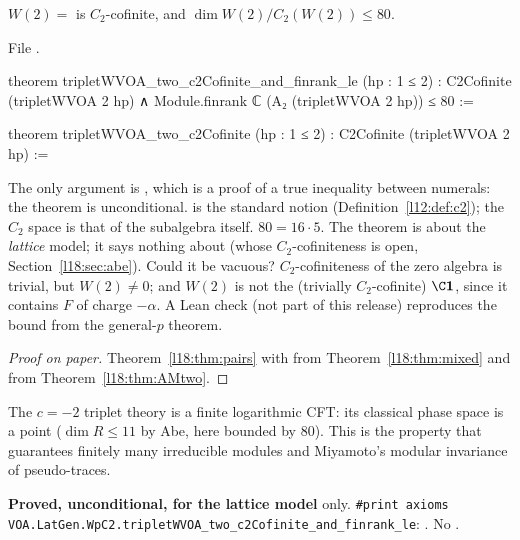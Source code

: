 \begin{theorem}\label{l18:thm:c2two}
$W(2)=$  is $C_2$-cofinite, and $\dim W(2)/C_2(W(2))\le80$.
\end{theorem}
\noindent File .
\begin{leancode}
theorem tripletWVOA_two_c2Cofinite_and_finrank_le (hp : 1 ≤ 2) :
    C2Cofinite (tripletWVOA 2 hp)
      ∧ Module.finrank ℂ (A₂ (tripletWVOA 2 hp)) ≤ 80 :=

theorem tripletWVOA_two_c2Cofinite (hp : 1 ≤ 2) : C2Cofinite (tripletWVOA 2 hp) :=
\end{leancode}
\begin{dictionary}
The only argument is , which is a proof of a true inequality between numerals: the
theorem is unconditional.  is the standard notion (Definition~\ref{l12:def:c2}); the $C_2$
space is that of the subalgebra itself. $80=16\cdot5$. The theorem is about the \emph{lattice} model; it
says nothing about  (whose $C_2$-cofiniteness is open, Section~\ref{l18:sec:abe}).
Could it be vacuous? $C_2$-cofiniteness of the zero algebra is trivial, but $W(2)\ne0$; and $W(2)$ is not
the (trivially $C_2$-cofinite) $\C\leighteenvac$, since it contains $F$ of charge $-\alpha$. A Lean check
(not part of this release) reproduces the bound from the general-$p$ theorem.
\end{dictionary}
\begin{proof}[Proof on paper]
Theorem~\ref{l18:thm:pairs} with  from Theorem~\ref{l18:thm:mixed} and
 from Theorem~\ref{l18:thm:AMtwo}.
\end{proof}
\begin{physics}
The $c=-2$ triplet theory is a finite logarithmic CFT: its classical phase space is a point
($\dim R\le11$ by Abe, here bounded by $80$). This is the property that guarantees finitely many irreducible
modules and Miyamoto's modular invariance of pseudo-traces.
\end{physics}
\begin{status}
\textbf{Proved, unconditional, for the lattice model}  only. \texttt{\#print axioms VOA.LatGen.WpC2.}\allowbreak\texttt{tripletWVOA\_two\_c2Cofinite\_and\_finrank\_le}:
. No .
\end{status}

